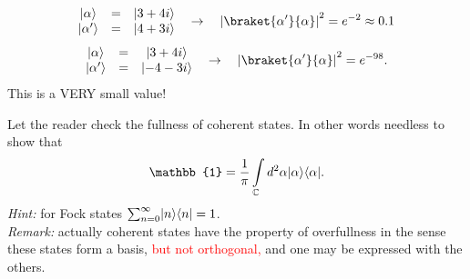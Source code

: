 \begin{testexample}
	\begin{equation}
	\begin{matrix}
	\ket{\alpha} &=& \ket{3+4i} \\
	\ket{\alpha'} &=& \ket{4+3i} \\
	\end{matrix}
	\quad \to \quad \left|\braket{\alpha'}{\alpha}\right|^2 = e^{-2} \approx 0.1
	\end{equation}
	\begin{equation}
	\begin{matrix}
	\ket{\alpha} &=& \ket{3+4i} \\
	\ket{\alpha'} &=& \ket{-4-3i} \\
	\end{matrix}
	\quad \to \quad \left|\braket{\alpha'}{\alpha}\right|^2  = e^{-98}.
	\end{equation}
	This is a VERY small value!
\end{testexample}

\begin{hw}
Let the reader check the fullness of coherent states. In other words needless to show that
\begin{equation}
	\mathbb{1} = \frac{1}{\pi} \int \limits_{\mathbb{C}} d^2 \alpha \ket{\alpha} \bra{\alpha}.
\end{equation}
\textit{Hint:} for Fock states $\sum_{n=0}^{\infty} \lvert n\rangle \langle n\rvert = 1$.\\
\textit{Remark:} actually coherent states have the property of overfullness in the sense these states form a basis,  {\textcolor{red}{ but not orthogonal,  }} and one may be expressed with the others.
\end{hw}

